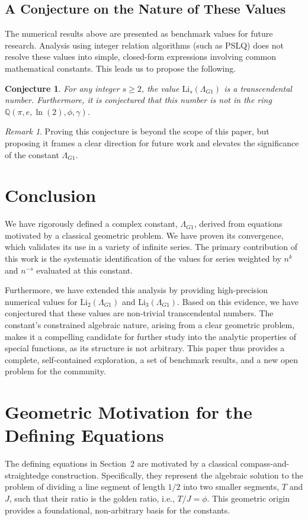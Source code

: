 \documentclass{amsart}
\theoremstyle{plain}
\newtheorem{conjecture}[theorem]{Conjecture}
\theoremstyle{definition}
\theoremstyle{remark}
\newtheorem*{remark}{Remark}
\newcommand{\LambdaG}{\Lambda_{G1}}
\begin{document}
\subsection{A Conjecture on the Nature of These Values}
The numerical results above are presented as benchmark values for future research. Analysis using integer relation algorithms (such as PSLQ) does not resolve these values into simple, closed-form expressions involving common mathematical constants. This leads us to propose the following.

\begin{conjecture}
For any integer $s \ge 2$, the value $\mathrm{Li}_s(\LambdaG)$ is a transcendental number. Furthermore, it is conjectured that this number is not in the ring $\mathbb{Q}(\pi, e, \ln(2), \phi, \gamma)$.
\end{conjecture}
\begin{remark}
Proving this conjecture is beyond the scope of this paper, but proposing it frames a clear direction for future work and elevates the significance of the constant $\LambdaG$.
\end{remark}

\section{Conclusion}
We have rigorously defined a complex constant, $\LambdaG$, derived from equations motivated by a classical geometric problem. We have proven its convergence, which validates its use in a variety of infinite series. The primary contribution of this work is the systematic identification of the values for series weighted by $n^k$ and $n^{-s}$ evaluated at this constant.

Furthermore, we have extended this analysis by providing high-precision numerical values for $\mathrm{Li}_2(\LambdaG)$ and $\mathrm{Li}_3(\LambdaG)$. Based on this evidence, we have conjectured that these values are non-trivial transcendental numbers. The constant's constrained algebraic nature, arising from a clear geometric problem, makes it a compelling candidate for further study into the analytic properties of special functions, as its structure is not arbitrary. This paper thus provides a complete, self-contained exploration, a set of benchmark results, and a new open problem for the community.

\appendix
\section{Geometric Motivation for the Defining Equations}
\label{app:A}
The defining equations in Section~2 are motivated by a classical compass-and-straightedge construction. Specifically, they represent the algebraic solution to the problem of dividing a line segment of length $1/2$ into two smaller segments, $T$ and $J$, such that their ratio is the golden ratio, i.e., $T/J = \phi$. This geometric origin provides a foundational, non-arbitrary basis for the constants.
\end{document}
